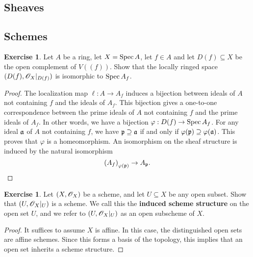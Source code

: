 \documentclass[]{pcmi}
\theoremstyle{plain}
\theoremstyle{definition}
\newtheorem{Exercise}[subsubsection]{Exercise}
\theoremstyle{remark}
\begin{document}
\subsection{Sheaves}

\subsection{Schemes}


\begin{Exercise}
    Let $A$ be a ring, let $X = \operatorname{Spec} A$, let $f \in A$ and let $D(f) \subseteq X$ be the open complement of $V((f))$. Show that the locally ringed space $(D(f), \mathscr{O}_X|_{D(f)})$ is isomorphic to $\operatorname{Spec} A_f$. 
\end{Exercise}

\begin{proof}
    The localization map $\ell : A \to A_f$ induces a bijection between ideals of $A$ not containing $f$ and the ideals of $A_f$. This bijection gives a one-to-one correspondence between the prime ideals of $A$ not containing $f$ and the prime ideals of $A_f$. In other words, we have a bijection $\varphi : D(f) \to \operatorname{Spec} A_f$. For any ideal $\mathfrak{a}$ of $A$ not containing $f$, we have $\mathfrak{p} \supseteq \mathfrak{a}$ if and only if $\varphi(\mathfrak{p}) \supseteq \varphi(\mathfrak{a})$. This proves that $\varphi$ is a homeomorphism. An isomorphism on the sheaf structure is induced by the natural isomorphism 
    \[
        \left( A_f \right)_{\varphi(\mathfrak{p})} \to A_{\mathfrak{p}}. 
    \]
\end{proof}

\begin{Exercise}
    Let $(X, \mathscr{O}_X)$ be a scheme, and let $U \subseteq X$ be any open subset. Show that $\left (U, \mathscr{O}_X|_U \right )$ is a scheme. We call this the \textbf{induced scheme structure} on the open set $U$, and we refer to $\left( U, \mathscr{O}_X|_U \right)$ as an open subscheme of $X$. 
\end{Exercise}

\begin{proof}
    It suffices to assume $X$ is affine. In this case, the distinguished open sets are affine schemes. Since this forms a basis of the topology, this implies that an open set inherits a scheme structure. 
\end{proof}
\end{document}
